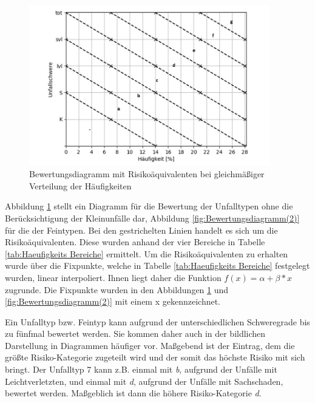 \begin{savenotes}
	\begin{figure}[H]
		\centering
		\includegraphics[width=10.5cm,height=7cm]{figures/Bewertungsdiagramm}
		\caption[Bewertungsdiagramm mit Risikoäquivalenten bei gleichmäßiger Verteilung der Häufigkeiten]{Bewertungsdiagramm mit Risikoäquivalenten bei gleichmäßiger Verteilung der Häufigkeiten}\label{fig:Bewertungsdiagramm}
	\end{figure}
\end{savenotes}

Abbildung \ref{fig:Bewertungsdiagramm} stellt ein Diagramm für die Bewertung der Unfalltypen ohne die Berücksichtigung der Kleinunfälle dar, Abbildung \ref{fig:Bewertungsdiagramm(2)} für die der Feintypen. Bei den gestrichelten Linien handelt es sich um die Risikoäquivalenten. Diese wurden anhand der vier Bereiche in Tabelle \ref{tab:Haeufigkeits Bereiche} ermittelt. Um die Risikoäquivalenten zu erhalten wurde über die Fixpunkte, welche in Tabelle \ref{tab:Haeufigkeits Bereiche} festgelegt wurden, linear interpoliert. Ihnen liegt daher die Funktion $f(x) = \alpha + \beta*x$ zugrunde. Die Fixpunkte wurden in den Abbildungen \ref{fig:Bewertungsdiagramm} und \ref{fig:Bewertungsdiagramm(2)} mit einem x gekennzeichnet. 

Ein Unfalltyp bzw. Feintyp kann aufgrund der unterschiedlichen Schweregrade bis zu fünfmal bewertet werden. Sie kommen daher auch in der bildlichen Darstellung in Diagrammen häufiger vor. Maßgebend ist der Eintrag, dem die größte Risiko-Kategorie zugeteilt wird und der somit das höchste Risiko mit sich bringt. Der Unfalltyp 7 kann z.B. einmal mit \textit{b}, aufgrund der Unfälle mit Leichtverletzten, und einmal mit \textit{d}, aufgrund der Unfälle mit Sachschaden, bewertet werden. Maßgeblich ist dann die höhere Risiko-Kategorie \textit{d}.

